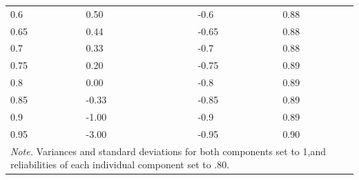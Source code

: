 \documentclass[authordate, meta, issue]{jote-new-article}
\begin{document}
\begin{table}[H]
\begin{fullwidth}
\begin{tabular}{@{} l l l l l@{}}
			 0.6 & 0.50 &  & -0.6 & 0.88 \\

			 0.65 & 0.44 &  & -0.65 & 0.88 \\

			 0.7 & 0.33 &  & -0.7 & 0.88 \\

			 0.75 & 0.20 &  & -0.75 & 0.89 \\

			 0.8 & 0.00 &  & -0.8 & 0.89 \\

			 0.85 & -0.33 &  & -0.85 & 0.89 \\

			 0.9 & -1.00 &  & -0.9 & 0.89 \\

			 0.95 & -3.00 &  & -0.95 & 0.90 \\
			 \hline
			\multicolumn{5}{p{10cm}}{\emph{Note. }Variances and standard deviations for both components set to 1,\newline and reliabilities of each individual component set to .80.}


		\end{tabular}
		\end{fullwidth}
	\end{table}
\end{document}
